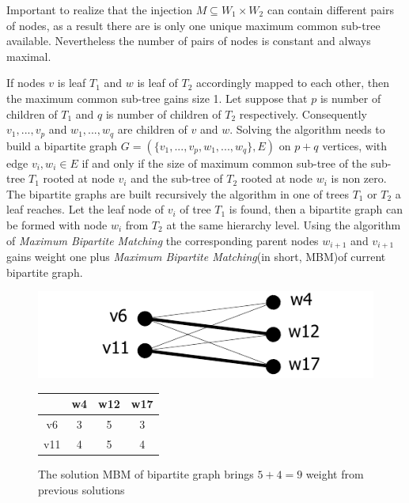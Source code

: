 \documentclass{report}
\begin{document}
Important to realize that the injection $M \subseteq W_{1} \times  W_{2}$ can contain different pairs of nodes, as a result there are is only one unique maximum common sub-tree available. Nevertheless the number of pairs of nodes is constant and always maximal.

If nodes $v$ is leaf $ T_{1}$ and $w$ is leaf of $T_{2 }$ accordingly mapped to each other, then the maximum common sub-tree gains size 1. Let suppose that $p$ is number of children of $ T_{1}$ and $q$ is number of children of $ T_{2}$ respectively. Consequently $ v_{1},...,v_{p}$ and $ w_{1},...,w_{q}$ are children of 
 $v$  and $w$\cite{valiente}. Solving the algorithm needs to build a bipartite graph $G=(\{v_{1},...,v_{p}, w_{1},...,w_{q} \}, E)$ on $p+q$ vertices, with edge 
$ v_{i},w_{i} \in E$  if and only if the size of maximum common sub-tree of the sub-tree $ T_{1}$ rooted at node $ v_{i}$ and the sub-tree of $T_{2 }$ rooted at node $ w_{i}$ is non zero\cite{valiente}. 
The bipartite graphs are built recursively the algorithm in one of trees $ T_{1}$ or $ T_{2}$ a leaf reaches. Let the leaf node of $ v_{i}$ of tree $ T_{1}$ is found, then a bipartite graph can be formed with node $ w_{i}$ from $ T_{2}$ at the same hierarchy level. Using the algorithm of \emph{Maximum Bipartite Matching} the corresponding parent nodes $ w_{i+1}$ and $ v_{i+1}$ gains weight one plus \emph{Maximum Bipartite Matching}(in short, MBM)of current bipartite graph.

\begin{figure}
  \begin{minipage}[h]{0.60\linewidth}
    \centering
    \includegraphics[scale=0.95]{Figures/algorithms/TD/1ex.pdf}\\[0.1cm]
    
  \end{minipage}%
  \begin{minipage}[b]{0.30\linewidth}
    \centering
\begin{tabular}{|c|c|c|c|}
\hline
    & w4 & w12                       & w17                       \\ \hline
v6  & 3  & \cellcolor[gray]{0.9} 5 & 3                         \\ \hline
v11 & 4  & 5                         & \cellcolor[gray]{0.9}4 \\ \hline
\end{tabular}
\end{minipage}
\caption{The solution MBM of bipartite graph brings $5+4=9$ weight from previous solutions}
\label{fig:ex1}
\end{figure}
\end{document}
